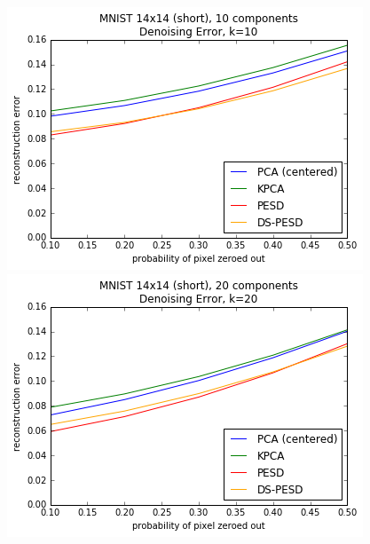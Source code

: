 \documentclass[]{article}
\begin{document}
\begin{figure}[!h]
\begin{center}
\includegraphics[scale=0.5]{figures/mnist_14_short_speckle_k10}
\includegraphics[scale=0.5]{figures/mnist_14_short_speckle_k20}


\end{center}
\end{figure}
\end{document}
